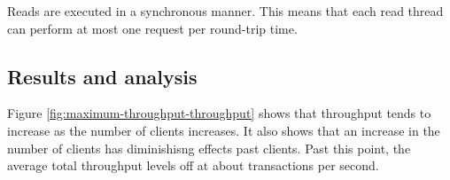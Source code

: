 \documentclass[11pt]{article}
\begin{document}
Reads are executed in a synchronous manner.
This means that each read thread can perform at most one request per round-trip time.

\subsection{Results and analysis}

Figure \ref{fig:maximum-throughput-throughput} shows that throughput tends to increase as the number of clients increases.
It also shows that an increase in the number of clients has diminishisng effects past \FIWRD clients.
Past this point, the average total throughput levels off at about \FIWRD transactions per second.

\end{document}
